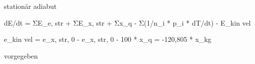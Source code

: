 stationär adiabut

dE/dt = ΣE_e, str + ΣE_x, str + Σx_q - Σ(1/n_i * p_i * dT/dt) - E_kin vel

e_kin vel = e_x, str, 0 - e_x, str, 0 - 100 * x_q = -120,805 * x_kg

vorgegeben
